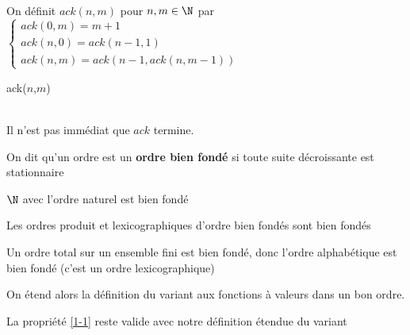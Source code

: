 \begin{example} \enspace \\
	\begin{minipage}{0.4\linewidth}
		On définit $ack(n,m)$ pour $n,m\in \N$ par \\ $\left\{\begin{array}{l}
			ack(0,m) = m+1\\
			ack(n, 0) = ack(n-1, 1)\\
			ack(n,m) = ack(n-1, ack(n, m-1))
		\end{array}\right.$
	\end{minipage}\quad
	\begin{minipage}{0.55\linewidth}
		\begin{algorithm}[H]
			\caption{ack($n$,$m$)}
		\end{algorithm}
	\end{minipage} \\Il n'est pas immédiat que $ack$ termine.
\end{example}

\begin{definition}
	On dit qu'un ordre est un \textbf{ordre bien fondé} si toute suite décroissante est stationnaire
\end{definition}

\begin{example}
	$\N$ avec l'ordre naturel est bien fondé 
\end{example}

\begin{proposition}
	Les ordres produit et lexicographiques d'ordre bien fondés sont bien fondés
\end{proposition}

\begin{example}
	Un ordre total sur un ensemble fini est bien fondé, donc l'ordre alphabétique est bien fondé (c'est un ordre lexicographique)
\end{example}

\begin{definition}
	On étend alors la définition du variant aux fonctions à valeurs dans un bon ordre.
\end{definition}

\begin{proposition}
	La propriété \ref{1-1} reste valide avec notre définition étendue du variant
\end{proposition}

